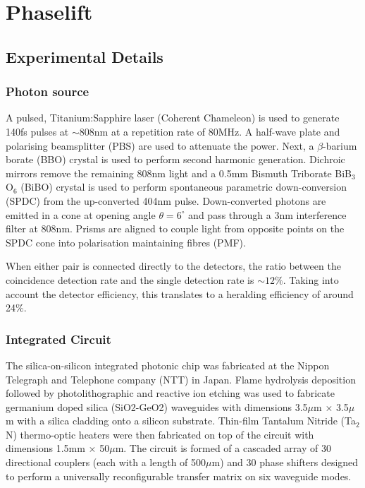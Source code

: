 
\chapter{Phaselift}
\label{cha:phaselift_appendix}

\section{Experimental Details}%
\label{sec:pl.experimental_details}

\subsection{Photon source}
A pulsed, Titanium:Sapphire laser (Coherent Chameleon) is used to generate 140fs pulses at $\sim808$nm at a repetition rate of $80$MHz.
A half-wave plate and polarising beamsplitter (PBS) are used to attenuate the power.
Next, a $\beta$-barium borate (BBO) crystal is used to perform second harmonic generation.
Dichroic mirrors remove the remaining 808nm light and a 0.5mm Bismuth Triborate BiB$_3$O$_6$ (BiBO) crystal is used to perform spontaneous parametric down-conversion (SPDC) from the up-converted 404nm pulse.
Down-converted photons are emitted in a cone at opening angle $\theta = 6^{\circ}$ and pass through a 3nm interference filter at 808nm.
Prisms are aligned to couple light from opposite points on the SPDC cone into polarisation maintaining fibres (PMF).

When either pair is connected directly to the detectors, the ratio between the coincidence detection rate and the single detection rate is $\sim12\%$.
Taking into account the detector efficiency, this translates to a heralding efficiency of around 24$\%$.

\subsection{Integrated Circuit}
The silica-on-silicon integrated photonic chip was fabricated at the Nippon Telegraph and Telephone company (NTT) in Japan.
Flame hydrolysis deposition followed by photolithographic and reactive ion etching was used to fabricate germanium doped silica (SiO2-GeO2) waveguides with dimensions 3.5$\mu$m $\times$ 3.5$\mu$m with a silica cladding onto a silicon substrate.
Thin-film Tantalum Nitride (Ta$_2$N) thermo-optic heaters were then fabricated on top of the circuit with dimensions 1.5mm $\times$ 50$\mu$m.
The circuit is formed of a cascaded array of 30 directional couplers (each with a length of 500$\mu$m) and 30 phase shifters designed to perform a universally reconfigurable transfer matrix on six waveguide modes.

